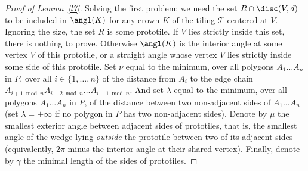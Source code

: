 \documentclass[12pt]{article}
\theoremstyle{remark}
\begin{document}
\begin{proof}[Proof of Lemma~\ref{l7}]
Solving the first problem:
we need the set $R\cap \disc(V,d)$ to be included in $\angl(K)$
for any crown $K$ of the tiling $\mathcal T$ centered at $V$.
Ignoring the size, the set $R$ is some prototile.
If $V$ lies strictly inside this set, there is nothing to prove. Otherwise
$\angl(K)$ is the interior angle at some vertex $V$ of this prototile, or
a straight angle whose vertex $V$ lies strictly inside some side of this prototile.
Set $\nu$ equal to the minimum, over all polygons $A_1\dots A_n$ in $P$, over all $i\in\{1,\dots,n\}$
of the distance from $A_i$ to the edge chain $A_{i+1\bmod n}A_{i+2\bmod n}\dots A_{i-1\bmod n}$.
And set $\lambda$ equal to the minimum, over all polygons $A_1\dots A_n$ in $P$, of the distance
between two non-adjacent sides of $A_1\dots A_n$ (set $\lambda=+\infty$ if no polygon in $P$ has two non-adjacent sides).
Denote by $\mu$ the smallest exterior angle between adjacent sides of prototiles, that is, the smallest angle of the wedge lying
\emph{outside} the prototile between two of its adjacent sides (equivalently, $2\pi$ minus the interior angle at their shared vertex).
Finally, denote by $\gamma$ the minimal length of the sides of prototiles.


\end{proof}
\end{document}
